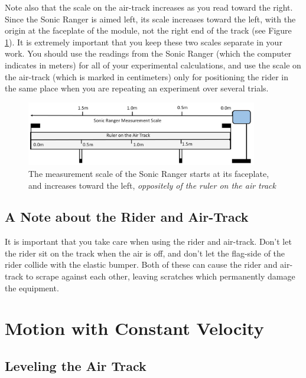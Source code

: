 Note also that the scale on the air-track increases as you read toward the right.  Since the Sonic Ranger is aimed left, its scale increases toward the left, with the origin at the faceplate of the module, not the right end of the track (see Figure \ref{fig:measurement}).  It is extremely important that you keep these two scales separate in your work.  You should use the readings from the Sonic Ranger (which the computer indicates in meters) for all of your experimental calculations, and use the scale on the air-track (which is marked in centimeters) only for positioning the rider in the same place when you are repeating an experiment over several trials.
\begin{figure}[h]
    \begin{center}
        \includegraphics[width=0.9\textwidth]{./Exp1-3/pic/image12.jpg}
    \end{center}
    \caption{The measurement scale of the Sonic Ranger starts at its faceplate, and increases toward the left, \emph{oppositely of the ruler on the air track}}
    \label{fig:measurement}
\end{figure}

\subsection{A Note about the Rider and Air-Track}

It is important that you take care when using the rider and air-track.  Don't let the rider sit on the track when the air is off, and don't let the flag-side of the rider collide with the elastic bumper. Both of these can cause the rider and air-track to scrape against each other, leaving scratches which permanently damage the equipment.

\section{Motion with Constant Velocity}

\subsection{Leveling the Air Track}

